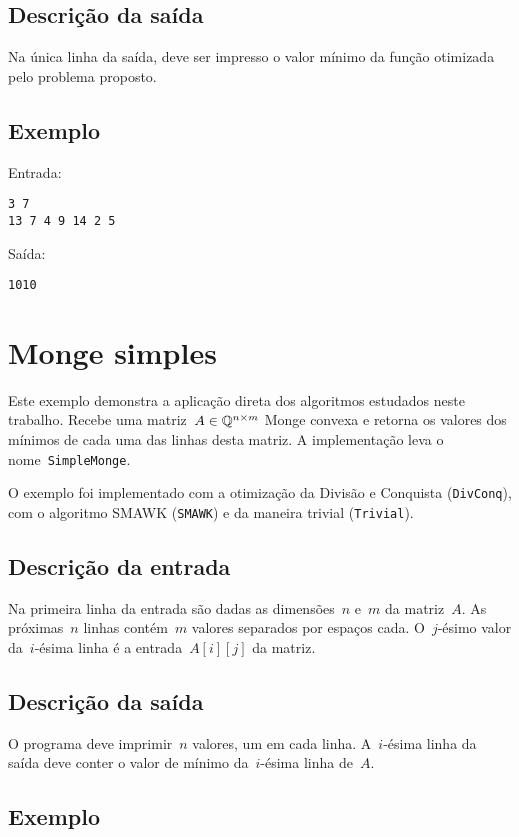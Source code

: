\subsection*{Descrição da saída}
Na única linha da saída, deve ser impresso o valor mínimo da função otimizada pelo problema proposto.

\subsection*{Exemplo}
Entrada:
\begin{verbatim}
3 7
13 7 4 9 14 2 5
\end{verbatim}
Saída:
\begin{verbatim}
1010
\end{verbatim}

\section{Monge simples} \label{SimpleMonge}

Este exemplo demonstra a aplicação direta dos algoritmos estudados neste trabalho. Recebe uma matriz~$A \in \mathbb{Q}^{n \times m}$ Monge convexa e retorna os valores dos mínimos de cada uma das linhas desta matriz. A implementação leva o nome~\texttt{SimpleMonge}.

O exemplo foi implementado com a otimização da Divisão e Conquista (\texttt{DivConq}), com o algoritmo SMAWK (\texttt{SMAWK}) e da maneira trivial (\texttt{Trivial}).

\subsection*{Descrição da entrada}

Na primeira linha da entrada são dadas as dimensões~$n$ e~$m$ da matriz~$A$. As próximas~$n$ linhas contém~$m$ valores separados por espaços cada. O~$j$-ésimo valor da~$i$-ésima linha é a entrada~$A[i][j]$ da matriz.

\subsection*{Descrição da saída}

O programa deve imprimir~$n$ valores, um em cada linha. A~$i$-ésima linha da saída deve conter o valor de mínimo da~$i$-ésima linha de~$A$.

\subsection*{Exemplo}

